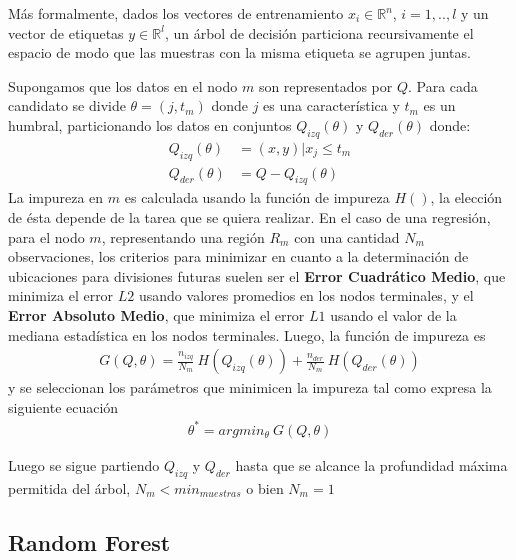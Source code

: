     \par Más formalmente, dados los vectores de entrenamiento $x_{i} \in \mathbb{R}^{n}$, $i = 1,..,l$
      y un vector de etiquetas $y \in \mathbb{R}^{l}$, un árbol de decisión particiona
      recursivamente el espacio de modo que las muestras con la misma etiqueta se agrupen juntas.


    \par Supongamos que los datos en el nodo $m$ son representados por $Q$. Para cada
      candidato se divide $\theta = (j, t_{m})$ donde $j$ es una característica y
      $t_{m}$ es un humbral, particionando los datos en conjuntos $Q_{izq}(\theta)$ y
      $Q_{der}(\theta)$ donde:
      \begin{align}
        Q_{izq}(\theta) &= (x, y) | x_{j} \leq t_m \\
        Q_{der}(\theta) &= Q - Q_{izq}(\theta)
      \end{align}
      La impureza en $m$ es calculada usando la función de impureza $H()$, la elección
      de ésta depende de la tarea que se quiera realizar.
      En el caso de una regresión, para el nodo $m$, representando una
      región $R_{m}$ con una cantidad $N_{m}$ observaciones, los criterios
      para minimizar en cuanto a la determinación de ubicaciones para divisiones
      futuras suelen ser el \textbf{Error Cuadrático Medio}, que minimiza el error $L2$ usando
      valores promedios en los nodos terminales, y el \textbf{Error Absoluto Medio}, que minimiza
      el error $L1$ usando el valor de la mediana estadística en los nodos terminales.
      Luego, la función de impureza es
      \begin{align}
        G(Q, \theta) = \frac{n_{izq}}{N_{m}} \ H(Q_{izq}(\theta)) + \frac{n_{der}}{N_{m}} \ H(Q_{der}(\theta))
      \end{align}
      y se seleccionan los parámetros que minimicen la impureza tal como expresa la
      siguiente ecuación
      \begin{align}
        \theta^{*} = argmin_{\theta} \ G(Q, \theta)
      \end{align}

      Luego se sigue partiendo $Q_{izq}$ y $Q_{der}$ hasta que se alcance la profundidad
      máxima permitida del árbol, $N_{m} < min_{muestras}$ o bien $N_{m} = 1$


  \subsection{Random Forest}

